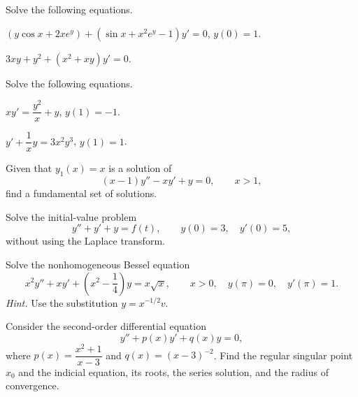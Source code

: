 \documentclass[11pt,oneside]{article}
\begin{document}
\begin{problem}
Solve the following equations.
\begin{problemsubparts}
\item $(y\cos x+2xe^y)+(\sin x+x^2e^y-1)y'=0$, $y(0)=1$.
\item $3xy+y^2+(x^2+xy)y'=0$.
\end{problemsubparts}
\end{problem}

\begin{problem}
Solve the following equations.
\begin{problemsubparts}
\item $xy'=\dfrac{y^2}{x}+y$, $y(1)=-1$.
\item $y'+\dfrac{1}{x}y=3x^2y^3$, $y(1)=1$.
\end{problemsubparts}
\end{problem}

\begin{problem}
Given that $y_1(x)=x$ is a solution of
\[(x-1)y''-xy'+y=0,\qquad x>1,\]
find a fundamental set of solutions.
\end{problem}

\begin{problem}
Solve the initial-value problem
\[y''+y'+y=f(t),\qquad y(0)=3,\quad y'(0)=5,\]
without using the Laplace transform.
\end{problem}

\begin{problem}
Solve the nonhomogeneous Bessel equation
\[x^2y''+xy'+\left(x^2-\frac14\right)y=x\sqrt{x},\qquad x>0,\quad y(\pi)=0,\quad y'(\pi)=1.\]
\textit{Hint.} Use the substitution $y=x^{-1/2}v$.
\end{problem}

\begin{problem}
Consider the second-order differential equation
\[y''+p(x)y'+q(x)y=0,\]
where $p(x)=\dfrac{x^2+1}{x-3}$ and $q(x)=(x-3)^{-2}$. Find the regular singular point $x_0$ and the indicial equation, its roots, the series solution, and the radius of convergence.
\end{problem}
\end{document}
